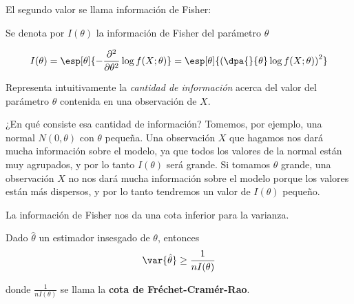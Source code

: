 \documentclass{apuntes}
\begin{document}
\noindent El segundo valor se llama información de Fisher:

\begin{defn} Se denota por $I(\theta)$ la información de Fisher del parámetro $\theta$

\[ I(\theta) =\esp[\theta]{-\frac{\partial^2}{\partial\theta^2} \log f(X;\theta)} =\esp[\theta]{\left(\dpa{}{\theta} \log f(X;\theta)\right)^2} \]

Representa intuitivamente la \textit{cantidad de información} acerca del valor del parámetro $\theta$ contenida en una observación de $X$.
\end{defn}

¿En qué consiste esa cantidad de información? Tomemos, por ejemplo, una normal $N(0,\theta)$ con $\theta$ pequeña. Una observación $X$ que hagamos nos dará mucha información sobre el modelo, ya que todos los valores de la normal están muy agrupados, y por lo tanto $I(\theta)$ será grande. Si tomamos $\theta$ grande, una observación $X$ no nos dará mucha información sobre el modelo porque los valores están más dispersos, y por lo tanto tendremos un valor de $I(\theta)$ pequeño.

La información de Fisher nos da una cota inferior para la varianza.

\begin{theorem} Dado $\hat\theta$ un estimador insesgado de $\theta$, entonces
\label{thmCotaFCR}
\[ \var{\hat\theta} \geq \frac{1}{nI(\theta)} \]

donde $\frac{1}{nI(\theta)}$ se llama la \textbf{cota de Fréchet-Cramér-Rao}.
\end{theorem}
\end{document}
